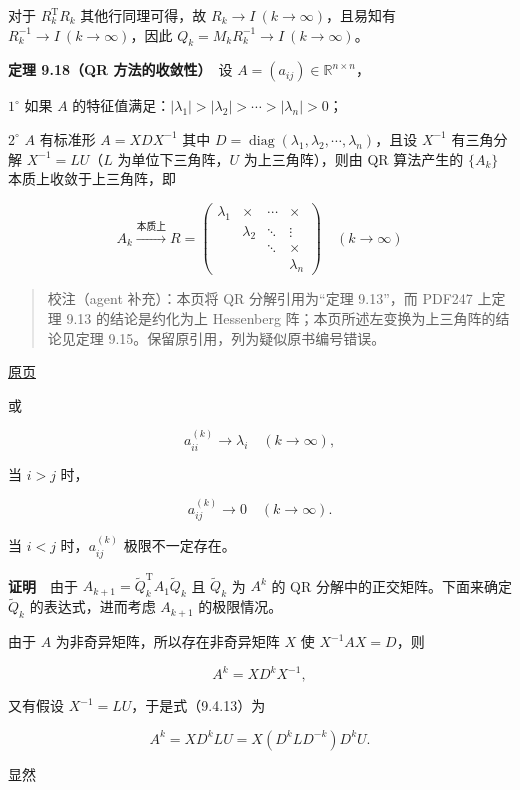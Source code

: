 \documentclass[
  10pt,
  fontset=fandol]{ctexart}
\begin{document}
对于 \(R_k^{\mathrm T}R_k\) 其他行同理可得，故 \(R_k\to I\ (k\to\infty)\)，且易知有 \(R_k^{-1}\to I\ (k\to\infty)\)，因此 \(Q_k=M_kR_k^{-1}\to I\ (k\to\infty)\)。

\textbf{定理 9.18（QR 方法的收敛性）}　设 \(A=(a_{ij})\in\mathbb R^{n\times n}\)，

\(1^\circ\) 如果 \(A\) 的特征值满足：\(|\lambda_1|>|\lambda_2|>\cdots>|\lambda_n|>0\)；

\(2^\circ\) \(A\) 有标准形 \(A=XDX^{-1}\) 其中 \(D=\operatorname{diag}(\lambda_1,\lambda_2,\cdots,\lambda_n)\)，且设 \(X^{-1}\) 有三角分解 \(X^{-1}=LU\)（\(L\) 为单位下三角阵，\(U\) 为上三角阵），则由 QR 算法产生的 \(\{A_k\}\) 本质上收敛于上三角阵，即

\[
A_k\xrightarrow{\text{本质上}}R=
\begin{pmatrix}
\lambda_1&\times&\cdots&\times\\
&\lambda_2&\ddots&\vdots\\
&&\ddots&\times\\
&&&\lambda_n
\end{pmatrix}\quad(k\to\infty)
\]

\begin{quote}
校注（agent 补充）：本页将 QR 分解引用为``定理 9.13''，而 PDF247 上定理 9.13 的结论是约化为上 Hessenberg 阵；本页所述左变换为上三角阵的结论见定理 9.15。保留原引用，列为疑似原书编号错误。
\end{quote}

\href{../../source-images/pdf-254.jpeg}{原页}

或

\[
a_{ii}^{(k)}\to\lambda_i\quad(k\to\infty),
\tag{9.4.11}
\]

当 \(i>j\) 时，

\[
a_{ij}^{(k)}\to0\quad(k\to\infty).
\tag{9.4.12}
\]

当 \(i<j\) 时，\(a_{ij}^{(k)}\) 极限不一定存在。

\textbf{证明}　由于 \(A_{k+1}=\widetilde Q_k^{\mathrm T}A_1\widetilde Q_k\) 且 \(\widetilde Q_k\) 为 \(A^k\) 的 QR 分解中的正交矩阵。下面来确定 \(\widetilde Q_k\) 的表达式，进而考虑 \(A_{k+1}\) 的极限情况。

由于 \(A\) 为非奇异矩阵，所以存在非奇异矩阵 \(X\) 使 \(X^{-1}AX=D\)，则

\[
A^k=XD^kX^{-1},
\tag{9.4.13}
\]

又有假设 \(X^{-1}=LU\)，于是式（9.4.13）为

\[
A^k=XD^kLU=X(D^kLD^{-k})D^kU.
\]

显然
\end{document}

